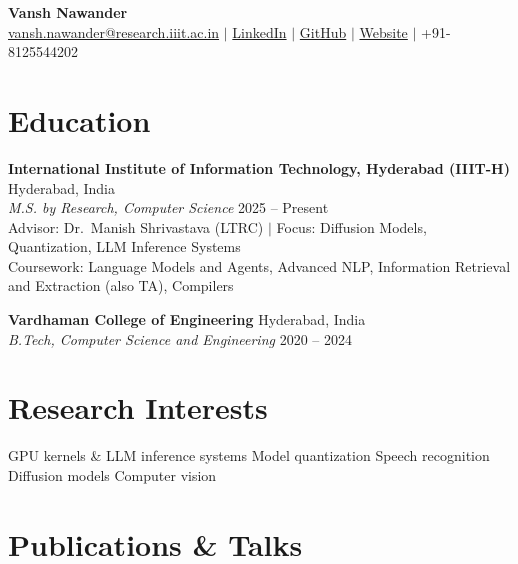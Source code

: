 \documentclass[letterpaper,10pt]{article}
\newcommand{\sep}{\;\textbullet\;}
\begin{document}
\begin{center}
  {\LARGE \textbf{Vansh Nawander}} \\[4pt]
  \href{mailto:vansh.nawander@research.iiit.ac.in}{vansh.nawander@research.iiit.ac.in} \;$|$\;
  \href{https://www.linkedin.com/in/vanshnawander/}{LinkedIn} \;$|$\;
  \href{https://github.com/vanshnawander}{GitHub} \;$|$\;
  \href{https://vanshnawander.github.io/vansh/index.html}{Website} \;$|$\;
  +91-8125544202
\end{center}

\section{Education}

\textbf{International Institute of Information Technology, Hyderabad (IIIT-H)} \hfill Hyderabad, India \\
\textit{M.S. by Research, Computer Science} \hfill 2025 -- Present \\
Advisor: Dr.\ Manish Shrivastava (LTRC) \;$|$\; Focus: Diffusion Models, Quantization, LLM Inference Systems \\
Coursework: Language Models and Agents, Advanced NLP, Information Retrieval and Extraction (also TA), Compilers

\medskip
\textbf{Vardhaman College of Engineering} \hfill Hyderabad, India \\
\textit{B.Tech, Computer Science and Engineering} \hfill 2020 -- 2024

\section{Research Interests}

GPU kernels \& LLM inference systems \sep Model quantization \sep Speech recognition \sep Diffusion models \sep Computer vision

\section{Publications \& Talks}
\end{document}

